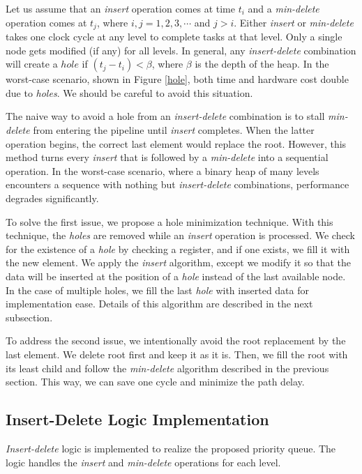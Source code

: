 \documentclass[10pt, conference, compsocconf]{IEEEtran}
\begin{document}
Let us assume that an {\it insert} operation comes at time $t_i$ and a {\it min-delete} operation comes at $t_j$, where $i, j = 1,2,3, \cdots$ and $j>i$.
Either {\it insert} or {\it min-delete} takes one clock cycle at any level to complete tasks at that level.
Only a single node gets modified (if any) for all levels.
In general, any {\it insert-delete} combination will create a $hole$ if $(t_j - t_i) < \beta$, where $\beta$ is the depth of the heap.
In the worst-case scenario, shown in Figure \ref{hole}, both time and hardware cost double due to {\it holes}. We should be careful to avoid this situation.

The naive way to avoid a hole from an {\it insert-delete} combination is to stall {\it min-delete} from entering the pipeline until {\it insert} completes.
When the latter operation begins, the correct last element would replace the root.
However, this method turns every {\it insert} that is followed by a {\it min-delete} into a sequential operation.
In the worst-case scenario, where a binary heap of many levels encounters a sequence with nothing but {\it insert-delete} combinations, performance degrades significantly.

To solve the first issue, we propose a hole minimization technique.
With this technique, the {\it holes} are removed while an {\it insert} operation is processed.
We check for the existence of a {\it hole} by checking a register, and if one exists, we fill it with the new element.
We apply the {\it insert} algorithm, except we modify it so that the data will be inserted at the position of a {\it hole} instead of the last available node.
In the case of multiple holes, we fill the last {\it hole} with inserted data for implementation ease.
Details of this algorithm are described in the next subsection.

To address the second issue, we intentionally avoid the root replacement by the last element.
We delete root first and keep it as it is.
Then, we fill the root with its least child and follow the {\it min-delete} algorithm described in the previous section.
This way, we can save one cycle and minimize the path delay.

\subsection{Insert-Delete Logic Implementation}

{\it Insert-delete} logic is implemented to realize the proposed priority queue.
The logic handles the {\it insert} and {\it min-delete} operations for each level.
\end{document}
